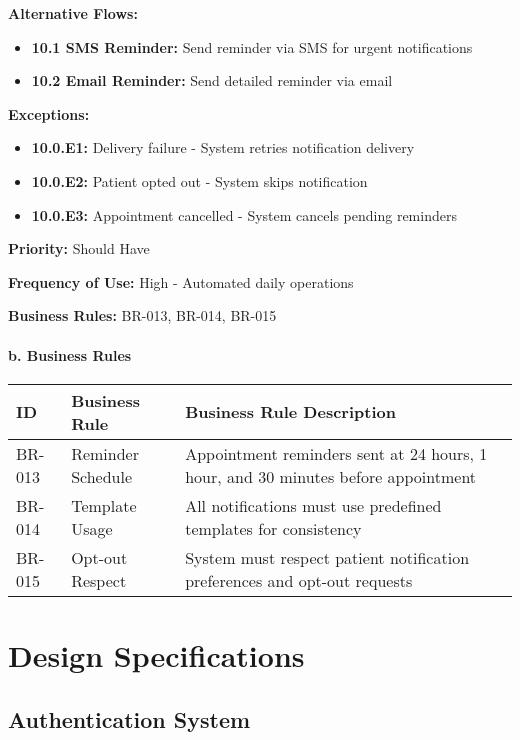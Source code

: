 \documentclass[12pt,a4paper]{article}
\begin{document}
\textbf{Alternative Flows:}
\begin{itemize}
    \item \textbf{10.1 SMS Reminder:} Send reminder via SMS for urgent notifications
    \item \textbf{10.2 Email Reminder:} Send detailed reminder via email
\end{itemize}

\textbf{Exceptions:}
\begin{itemize}
    \item \textbf{10.0.E1:} Delivery failure - System retries notification delivery
    \item \textbf{10.0.E2:} Patient opted out - System skips notification
    \item \textbf{10.0.E3:} Appointment cancelled - System cancels pending reminders
\end{itemize}

\textbf{Priority:} Should Have

\textbf{Frequency of Use:} High - Automated daily operations

\textbf{Business Rules:} BR-013, BR-014, BR-015

\paragraph{b. Business Rules}

\begin{longtable}{|p{2cm}|p{4cm}|p{8cm}|}
\hline
\textbf{ID} & \textbf{Business Rule} & \textbf{Business Rule Description} \\
\hline
BR-013 & Reminder Schedule & Appointment reminders sent at 24 hours, 1 hour, and 30 minutes before appointment \\
\hline
BR-014 & Template Usage & All notifications must use predefined templates for consistency \\
\hline
BR-015 & Opt-out Respect & System must respect patient notification preferences and opt-out requests \\
\hline
\end{longtable}

\section{Design Specifications}

\subsection{Authentication System}
\end{document}
